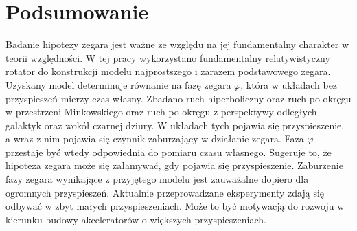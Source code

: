\section{Podsumowanie}
Badanie hipotezy zegara jest ważne ze względu na jej 
fundamentalny charakter w teorii względności. 
W tej pracy wykorzystano fundamentalny relatywistyczny rotator 
do konstrukcji modelu najprostszego i zarazem podstawowego 
zegara. Uzyskany model determinuje równanie na fazę zegara $\varphi$,
która w układach bez przyspieszeń mierzy czas własny. 
Zbadano ruch hiperboliczny oraz ruch po okręgu 
w przestrzeni Minkowskiego oraz
ruch po okręgu z perspektywy odległych galaktyk oraz wokół czarnej 
dziury.
W układach tych pojawia się przyspieszenie, a wraz z nim  
pojawia się czynnik zaburzający w działanie zegara. 
Faza $\varphi$ przestaje być wtedy odpowiednia do pomiaru 
 czasu własnego. Sugeruje to, że hipoteza zegara może 
się załamywać, gdy pojawia się przyspieszenie. 
Zaburzenie fazy zegara wynikające z przyjętego modelu
 jest zauważalne dopiero dla
 ogromnych przyspieszeń.
Aktualnie przeprowadzane eksperymenty zdają się odbywać w zbyt małych 
przyspieszeniach. Może to być motywacją do rozwoju w kierunku 
budowy akceleratorów o większych przyspieszeniach.
